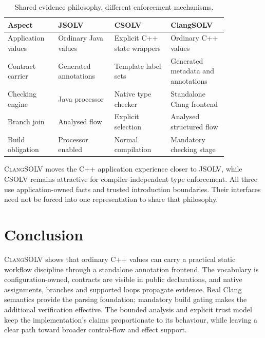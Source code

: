 \documentclass[11pt]{article}
\newcommand{\clangsolv}{\textsc{ClangSOLV}}
\newcommand{\csolv}{\textsc{CSOLV}}
\newcommand{\jsolv}{\textsc{JSOLV}}
\begin{document}
\begin{table}[ht]
\centering\small
\begin{tabular}{>{\raggedright\arraybackslash}p{0.19\linewidth}>{\raggedright\arraybackslash}p{0.22\linewidth}>{\raggedright\arraybackslash}p{0.22\linewidth}>{\raggedright\arraybackslash}p{0.22\linewidth}}
\toprule
Aspect & JSOLV & CSOLV & ClangSOLV\\
\midrule
Application values & Ordinary Java values & Explicit C++ state wrappers & Ordinary C++ values\\
Contract carrier & Generated annotations & Template label sets & Generated metadata and annotations\\
Checking engine & Java processor & Native type checker & Standalone Clang frontend\\
Branch join & Analysed flow & Explicit selection & Analysed structured flow\\
Build obligation & Processor enabled & Normal compilation & Mandatory checking stage\\
\bottomrule
\end{tabular}
\caption{Shared evidence philosophy, different enforcement mechanisms.}
\end{table}
\clangsolv{} moves the C++ application experience closer to \jsolv{}, while
\csolv{} remains attractive for compiler-independent type enforcement. All
three use application-owned facts and trusted introduction boundaries. Their
interfaces need not be forced into one representation to share that philosophy.

\section{Conclusion}
\clangsolv{} shows that ordinary C++ values can carry a practical static
workflow discipline through a standalone annotation frontend. The vocabulary
is configuration-owned, contracts are visible in public declarations, and
native assignments, branches and supported loops propagate evidence. Real
Clang semantics provide the parsing foundation; mandatory build gating makes
the additional verification effective. The bounded analysis and explicit
trust model keep the implementation's claims proportionate to its behaviour,
while leaving a clear path toward broader control-flow and effect support.
\end{document}
